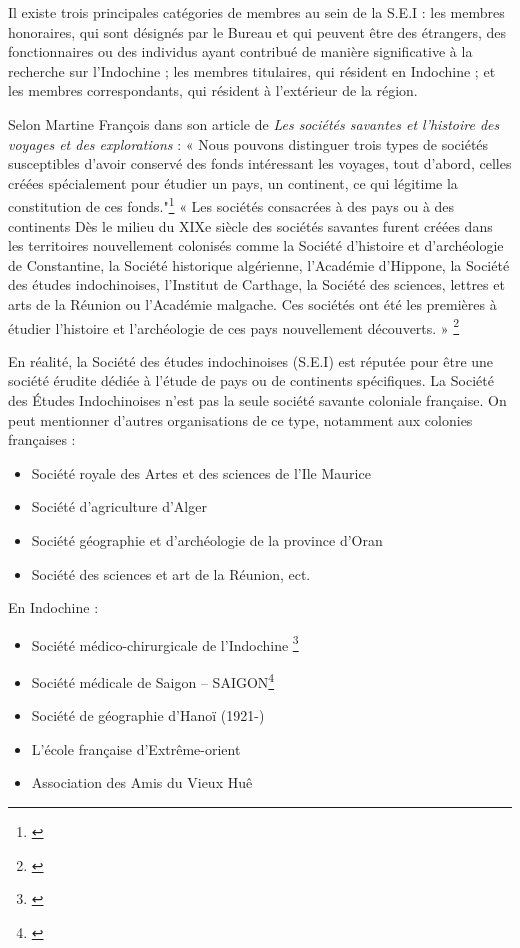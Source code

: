 Il existe trois principales catégories de membres au sein de la S.E.I : les membres honoraires, qui sont désignés par le Bureau et qui peuvent être des étrangers, des fonctionnaires ou des individus ayant contribué de manière significative à la recherche sur l'Indochine ; les membres titulaires, qui résident en Indochine ; et les membres correspondants, qui résident à l'extérieur de la région.

Selon Martine François dans son article de \textit{Les sociétés savantes et l’histoire des voyages et des explorations} :
« Nous pouvons distinguer trois types de sociétés susceptibles d’avoir conservé des fonds intéressant les voyages, tout d’abord, celles créées spécialement pour étudier un pays, un continent, ce qui légitime la constitution de ces fonds."\footnote{\cite{ak}}
« Les sociétés consacrées à des pays ou à des continents Dès le milieu du XIXe siècle des sociétés savantes furent créées dans les territoires nouvellement colonisés comme la Société d’histoire et d’archéologie de Constantine, la Société historique algérienne, l’Académie d’Hippone, la Société des études indochinoises, l’Institut de Carthage, la Société des sciences, lettres et arts de la Réunion ou l’Académie malgache. Ces sociétés ont été les premières à étudier l’histoire et l’archéologie de ces pays nouvellement découverts. » \footnote{\cite{ak}}

En réalité, la Société des études indochinoises (S.E.I) est réputée pour être une société érudite dédiée à l'étude de pays ou de continents spécifiques. La Société des Études Indochinoises n'est pas la seule société savante coloniale française. On peut mentionner d'autres organisations de ce type, notamment aux colonies françaises : 

\begin{itemize}
    \item Société royale des Artes et des sciences de l’Ile Maurice
    \item Société d’agriculture d’Alger
    \item Société géographie et d’archéologie de la province d’Oran
    \item Société des sciences et art de la Réunion, ect.
\end{itemize}

En Indochine : 
\begin{itemize}
    \item Société médico-chirurgicale de l'Indochine \footnote{\cite{al}}
    \item Société médicale de Saigon – SAIGON\footnote{\cite{ab}}
    \item Société de géographie d'Hanoï (1921-)
    \item L'école française d'Extrême-orient
    \item Association des Amis du Vieux Huê
\end{itemize}


